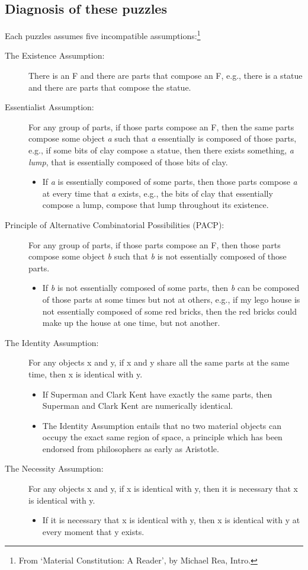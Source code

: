 \documentclass[oneside]{article}
\begin{document}
\subsection*{Diagnosis of these puzzles}

Each puzzles assumes five incompatible assumptions:\footnote{From `Material  Constitution: A  Reader',  by Michael Rea, Intro.}
\begin{description}
\item [The Existence Assumption:] There is an F and there are parts that compose an F, e.g., there is a statue and there are parts that compose the statue. 
\item [Essentialist Assumption:] For any group of parts, if those parts compose an F, then the same parts compose some object \emph{a} such that \emph{a} essentially is composed of those parts, e.g., if some bits of clay compose a statue, then there exists something, \emph{a lump}, that is essentially composed of those bits of clay. 
\begin{itemize}
\item If \emph{a} is essentially composed of some parts, then those parts compose \emph{a} at every time that \emph{a} exists, e.g., the bits of clay that essentially compose a lump, compose that lump throughout its existence. 
\end{itemize}
\item [Principle of Alternative Combinatorial Possibilities (PACP):] For any group of parts, if those parts compose an F, then those parts compose some object \emph{b} such that  \emph{b} is not essentially composed of those parts.
\begin{itemize}
\item If \emph{b} is not essentially composed of some parts, then \emph{b} can be composed of  those parts at some times but not at others, e.g., if my lego house is not essentially composed of some red bricks, then the red bricks could make up the house at one time, but not another. 
\end{itemize}
\item [The Identity Assumption:] For any objects x  and y, if x and y  share all the same parts at the same time, then x is identical with y. 
\begin{itemize}
\item If Superman and Clark Kent have exactly the same parts,  then Superman and Clark Kent are numerically identical. 
\item The Identity Assumption entails that no two material objects can occupy the exact same region of space, a principle which has been endorsed from philosophers as early as Aristotle. 
\end{itemize}

\item[The Necessity Assumption:] For any objects x  and y, if x is identical with y, then it is necessary that x is identical with y.
\begin{itemize}
\item If it is necessary that x is identical with y, then x is identical with y at every moment that y exists. 
\end{itemize}
\end{description}
\end{document}
